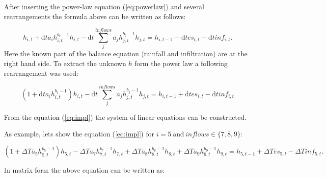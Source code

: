         After inserting the power-law equation (\ref{eq:powerlaw}) and several rearrangements the formula above can be written 
        as follows: 



        $$
          h_{i,t} + \mathrm{d} t a_ih^{b_{i}-1}_{i,t} h_{i,t} - \mathrm{d} t \sum_j^{inflows}
          a_jh^{b_{j}-1}_{j,t} h_{j,t} = h_{i,t-1} + \mathrm{d} t es_{i,t} - \mathrm{d}
          t inf_{i,t}.
        $$
        Here the known part of the balance equation (rainfall and infiltration) are at the right hand side. To 
        extract the unknown $h$ form the power law a following rearrangement was used:



        \begin{equation}
          (1+\mathrm{d} t a_ih^{b_{i}-1}_{i,t})h_{i,t} - \mathrm{d} t \sum_j^{inflows}
          a_jh^{b_{j}-1}_{j,t} h_{j,t} = h_{i,t-1} + \mathrm{d} t es_{i,t} -
          \mathrm{d} t inf_{i,t}
          \label{eq:impl}
        \end{equation}

        From the equation (\ref{eq:impl}) the system of linear equations can be constructed. 

        As example, lets show the equation (\ref{eq:impl}) for
        $
        i=5\ \mathrm{and}\ inflows\in\{7,8,9\}
        $:


        \begin{dmath}
          (1+\Delta T a_5h^{b_{5}-1}_{5,t})h_{5,t} - \Delta T a_7h^{b_{7}-1}_{7,t} h_{7,t} + \Delta T a_8h^{b_{8}-1}_{8,t} h_{8,t} + \Delta T a_9 h^{b_{9}-1}_{9,t} h_{9,t}  = h_{5,t-1} + \Delta T es_{5,t} - \Delta T inf_{5,t}.
        \end{dmath}

        In matrix form the above equation can be written as:



